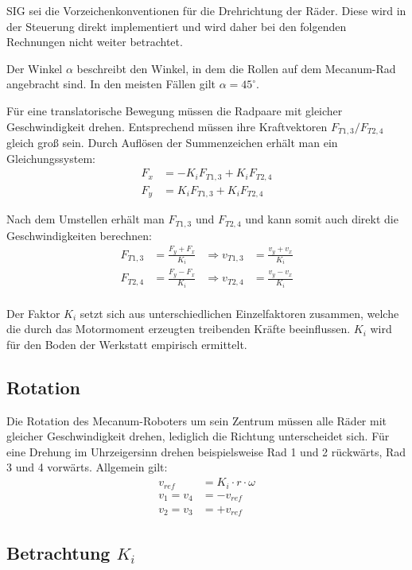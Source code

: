 SIG sei die Vorzeichenkonventionen für die Drehrichtung der Räder.
Diese wird in der Steuerung direkt implementiert und wird daher bei den folgenden Rechnungen nicht weiter betrachtet.

Der Winkel $ \alpha $ beschreibt den Winkel, in dem die Rollen auf dem Mecanum-Rad angebracht sind.
In den meisten Fällen gilt $\alpha = 45^\circ$.

Für eine translatorische Bewegung müssen die Radpaare mit gleicher Geschwindigkeit drehen.
Entsprechend müssen ihre Kraftvektoren $F_{T1, 3} / F_{T2, 4}$ gleich groß sein.
Durch Auflösen der Summenzeichen erhält man ein Gleichungssystem:
\begin{align*}
    F_x &= - K_i F_{T1, 3} + K_i F_{T2, 4} \\
    F_y &= K_i F_{T1, 3}   + K_i F_{T2, 4}
\end{align*}

Nach dem Umstellen erhält man $F_{T1, 3}$ und $F_{T2, 4}$ und kann somit auch direkt die Geschwindigkeiten berechnen:
\begin{align*}
    F_{T1, 3} &= \frac{F_y + F_x}{K_i} &\Rightarrow v_{T1, 3} &= \frac{v_y + v_x}{K_i} \\
    F_{T2, 4} &= \frac{F_y - F_x}{K_i} &\Rightarrow v_{T2, 4} &= \frac{v_y - v_x}{K_i} \\
\end{align*}

Der Faktor $K_i$ setzt sich aus unterschiedlichen Einzelfaktoren zusammen, welche die durch das Motormoment erzeugten treibenden Kräfte beeinflussen. $K_i$ wird für den Boden der Werkstatt empirisch ermittelt.


\subsection{Rotation}
\label{sec:Rotation}
Die Rotation des Mecanum-Roboters um sein Zentrum müssen alle Räder mit gleicher Geschwindigkeit drehen, lediglich die Richtung unterscheidet sich.
Für eine Drehung im Uhrzeigersinn drehen beispielsweise Rad 1 und 2 rückwärts, Rad 3 und 4 vorwärts. Allgemein gilt:
\begin{align*}
    v_{ref} &= K_i \cdot r \cdot \omega \\
    v_1 = v_4 &= - v_{ref} \\
    v_2 = v_3 &= + v_{ref}
\end{align*}

\subsection{Betrachtung $K_i$}
\label{sec:k-faktor}

